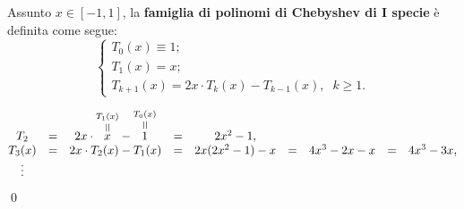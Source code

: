 \begin{definition}\label{def:polinomi_chebyshev_I_specie}
    Assunto $x\in [-1,1]$, la \textbf{famiglia di polinomi di Chebyshev di I specie} è definita come segue:
    \begin{equation}\label{eq:polChebISp}
        \begin{cases}
        T_0(x) \equiv 1;\\
        T_1(x) = x;\\
        T_{k+1}(x) = 2x\cdot T_k(x)-T_{k-1}(x),\;\; k\geq 1.
        \end{cases}
    \end{equation}
\end{definition}

\begin{example}
    \begin{equation*}
        \begin{matrix}
            T_2 &=& 2x \cdot \equaltoup{x}{T_1(x)} - \equaltoup{1}{T_0(x)} &=& 2x^2-1,\\
            T_3(x) &=& 2x\cdot T_2(x)-T_1(x)&=&2x(2x^2-1)-x&=& 4x^3-2x-x &=& 4x^3-3x,\\
            \vdots
        \end{matrix}
    \end{equation*}
    \qed
\end{example}

